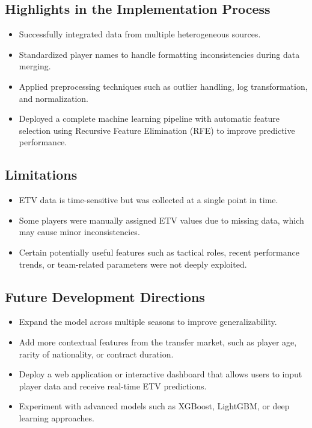 \documentclass[12pt,a4paper]{article}
\begin{document}
\subsection{Highlights in the Implementation Process}
\begin{itemize}
    \item Successfully integrated data from multiple heterogeneous sources.
    \item Standardized player names to handle formatting inconsistencies during data merging.
    \item Applied preprocessing techniques such as outlier handling, log transformation, and normalization.
    \item Deployed a complete machine learning pipeline with automatic feature selection using Recursive Feature Elimination (RFE) to improve predictive performance.
\end{itemize}

\subsection{Limitations}
\begin{itemize}
    \item ETV data is time-sensitive but was collected at a single point in time.
    \item Some players were manually assigned ETV values due to missing data, which may cause minor inconsistencies.
    \item Certain potentially useful features such as tactical roles, recent performance trends, or team-related parameters were not deeply exploited.
\end{itemize}

\subsection{Future Development Directions}
\begin{itemize}
    \item Expand the model across multiple seasons to improve generalizability.
    \item Add more contextual features from the transfer market, such as player age, rarity of nationality, or contract duration.
    \item Deploy a web application or interactive dashboard that allows users to input player data and receive real-time ETV predictions.
    \item Experiment with advanced models such as XGBoost, LightGBM, or deep learning approaches.
\end{itemize}
\end{document}

